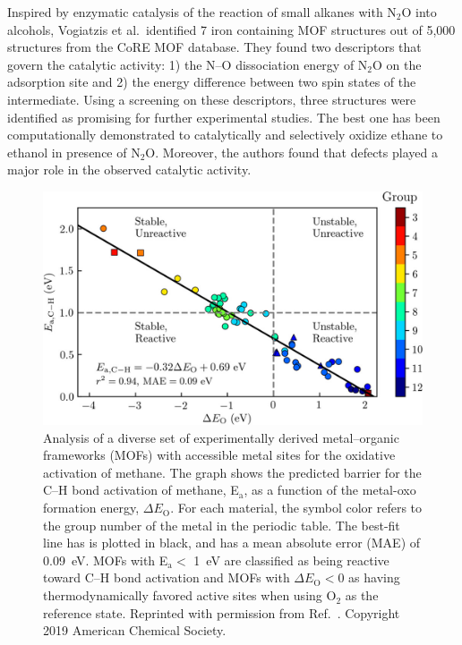 \documentclass[main.tex]{subfiles}
\begin{document}
Inspired by enzymatic catalysis of the reaction of small alkanes with N$_2$O into alcohols, Vogiatzis et al.\ identified 7 iron containing MOF structures out of 5,000 structures from the CoRE MOF database.\cite{Vogiatzis_2016} They found two descriptors that govern the catalytic activity: 1) the N--O dissociation energy of N$_2$O on the adsorption site and 2) the energy difference between two spin states of the intermediate.
Using a screening on these descriptors, three structures were identified as promising for further experimental studies. The best one has been computationally demonstrated to catalytically and selectively oxidize ethane to ethanol in presence of N$_2$O. Moreover, the authors found that defects played a major role in the observed catalytic activity.

\begin{figure}[ht]
\centering
  \includegraphics[width=0.8\linewidth]{figures/1-screening/Rosen_2019.jpeg}
  \caption{Analysis of a diverse set of experimentally derived metal--organic frameworks (MOFs) with accessible metal sites for the oxidative activation of methane. The graph shows the predicted barrier for the C--H bond activation of methane, E$_\text{a}$, as a function of the metal-oxo formation energy, $\Delta E_\text{O}$. For each material, the symbol color refers to the group number of the metal in the periodic table. The best-fit line has is plotted in black, and has a mean absolute error (MAE) of \SI{0.09}{\eV}. MOFs with E$_\text{a}<$ \SI{1}{\eV} are classified as being reactive toward C--H bond activation and MOFs with $\Delta E_\text{O}<0$ as having thermodynamically favored active sites when using O$_2$ as the reference state. Reprinted with permission from Ref.~. Copyright 2019 American Chemical Society.}
  \label{fgr:Rosen_2019}
\end{figure}
\end{document}
